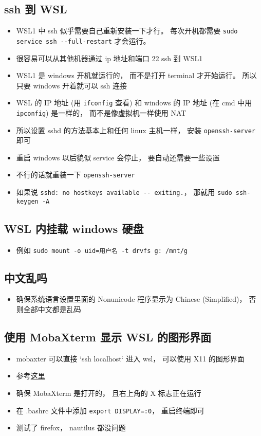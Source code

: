 \subsection{ssh 到 WSL}
\begin{itemize}
\item WSL1 中 ssh 似乎需要自己重新安装一下才行。 每次开机都需要 \verb|sudo service ssh --full-restart| 才会运行。
\item 很容易可以从其他机器通过 ip 地址和端口 22 ssh 到 WSL1
\item WSL1 是 windows 开机就运行的， 而不是打开 terminal 才开始运行。 所以只要 windows 开着就可以 ssh 连接
\item WSL 的 IP 地址 (用 \verb`ifconfig` 查看) 和 windows 的 IP 地址 (在 cmd 中用 \verb`ipconfig`) 是一样的， 而不是像虚拟机一样使用 NAT
\item 所以设置 sshd 的方法基本上和任何 linux 主机一样， 安装 \verb`openssh-server` 即可
\item 重启 windows 以后貌似 service 会停止， 要自动还需要一些设置
\item 不行的话就重装一下 \verb|openssh-server|
\item 如果说 \verb|sshd: no hostkeys available -- exiting.|， 那就用 \verb|sudo ssh-keygen -A|
\end{itemize}

\subsection{WSL 内挂载 windows 硬盘}
\begin{itemize}
\item 例如 \verb`sudo mount -o uid=用户名 -t drvfs g: /mnt/g`
\end{itemize}

\subsection{中文乱吗}
\begin{itemize}
\item 确保系统语言设置里面的 Nonunicode 程序显示为 Chinese (Simplified)， 否则全部中文都是乱码
\end{itemize}

\subsection{使用 MobaXterm 显示 WSL 的图形界面}
\begin{itemize}
\item mobaxter 可以直接 `ssh localhost` 进入 wsl， 可以使用 X11 的图形界面
\item 参考\href{https://nickjanetakis.com/blog/using-wsl-and-mobaxterm-to-create-a-linux-dev-environment-on-windows}{这里}
\item 确保 MobaXterm 是打开的， 且右上角的 X 标志正在运行
\item 在 .bashrc 文件中添加 \verb`export DISPLAY=:0`， 重启终端即可
\item 测试了 firefox， nautilus 都没问题
\end{itemize}

